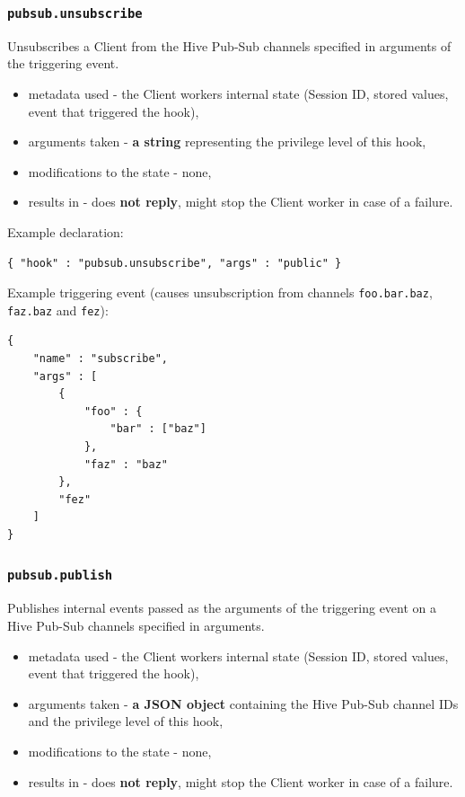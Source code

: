 \documentclass[a4paper]{article}
\begin{document}
\subsubsection{\texttt{pubsub.unsubscribe}}
\label{sec-8-2-5}


Unsubscribes a Client from the Hive Pub-Sub channels specified in arguments of the triggering event.


\begin{itemize}
\item metadata used - the Client workers internal state (Session ID, stored values, event that triggered the hook),
\item arguments taken - \textbf{a string} representing the privilege level of this hook,
\item modifications to the state - none,
\item results in - does \textbf{not reply}, might stop the Client worker in case of a failure.
\end{itemize}

\noindent
Example declaration:

\begin{verbatim}
{ "hook" : "pubsub.unsubscribe", "args" : "public" }
\end{verbatim}




\noindent
Example triggering event (causes unsubscription from channels \texttt{foo.bar.baz}, \texttt{faz.baz} and \texttt{fez}):


\begin{verbatim}
{
    "name" : "subscribe",
    "args" : [
        {
            "foo" : {
                "bar" : ["baz"]
            },
            "faz" : "baz"
        },
        "fez"
    ]
}
\end{verbatim}
\subsubsection{\texttt{pubsub.publish}}
\label{sec-8-2-6}


Publishes internal events passed as the arguments of the triggering event on a Hive Pub-Sub channels specified in arguments.


\begin{itemize}
\item metadata used - the Client workers internal state (Session ID, stored values, event that triggered the hook),
\item arguments taken - \textbf{a JSON object} containing the Hive Pub-Sub channel IDs and the privilege level of this hook,
\item modifications to the state - none,
\item results in - does \textbf{not reply}, might stop the Client worker in case of a failure.
\end{itemize}
\end{document}
